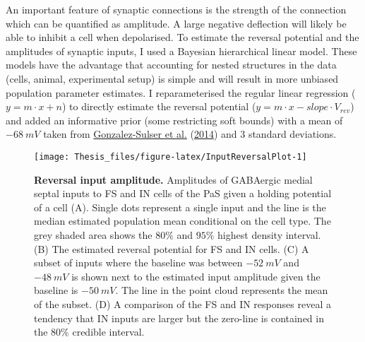 \documentclass[
  12pt,
  a4paper,
  openany]{book}
\begin{document}
\noindent An important feature of synaptic connections is the strength of the connection which can be quantified as amplitude. A large negative deflection will likely be able to inhibit a cell when depolarised. To estimate the reversal potential and the amplitudes of synaptic inputs, I used a Bayesian hierarchical linear model. These models have the advantage that accounting for nested structures in the data (cells, animal, experimental setup) is simple and will result in more unbiased population parameter estimates. I reparameterised the regular linear regression (\(y = m \cdot x + n\)) to directly estimate the reversal potential (\(y=m \cdot x - slope \cdot V_{rev}\)) and added an informative prior (some restricting soft bounds) with a mean of \(-68\ mV\) taken from \protect\hyperlink{ref-gonzalez-sulser_gabaergic_2014}{Gonzalez-Sulser et al.} (\protect\hyperlink{ref-gonzalez-sulser_gabaergic_2014}{2014}) and \(3\) standard deviations.




\begin{figure}[H]

{\centering \texttt{[image: Thesis\_files/figure-latex/InputReversalPlot-1]} 

}

\caption[Reversal input amplitude]{\textbf{Reversal input amplitude.} Amplitudes of GABAergic medial septal inputs to FS and IN cells of the PaS given a holding potential of a cell (A). Single dots represent a single input and the line is the median estimated population mean conditional on the cell type. The grey shaded area shows the \(80\%\) and \(95\%\) highest density interval. (B) The estimated reversal potential for FS and IN cells. (C) A subset of inputs where the baseline was between \(-52\ mV\) and \(-48\ mV\) is shown next to the estimated input amplitude given the baseline is \(-50\ mV\). The line in the point cloud represents the mean of the subset. (D) A comparison of the FS and IN responses reveal a tendency that IN inputs are larger but the zero-line is contained in the \(80\%\) credible interval.}\label{fig:InputReversalPlot}
\end{figure}
\end{document}
